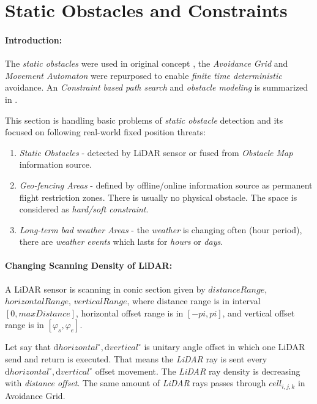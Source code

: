 \cleardoublepage
\section{Static Obstacles and Constraints}\label{s:staticObstacles}
    
\paragraph{Introduction:} The \emph{static obstacles} were used in original concept \cite{gomola2017probabilistic}, the \emph{Avoidance Grid} and \emph{Movement Automaton} were repurposed to enable \emph{finite time deterministic} avoidance. An \emph{Constraint based path search} and \emph{obstacle modeling} is summarized in \cite{hentenryck2009constraint}.

This section is handling basic problems of \emph{static obstacle} detection and its focused on following real-world fixed position threats:
\begin{enumerate}
    \item \emph{Static Obstacles} - detected by LiDAR sensor or fused from \emph{Obstacle Map} information source.
    
    \item \emph{Geo-fencing Areas} - defined by offline/online information source as permanent flight restriction zones. There is usually no physical obstacle. The space is considered as \emph{hard/soft constraint}.
    
    \item \emph{Long-term bad weather Areas} - the \emph{weather} is changing often (hour period), there are \emph{weather events}  which lasts for \emph{hours} or \emph{days}.
\end{enumerate}


\paragraph{Changing Scanning Density of LiDAR:} A LiDAR sensor is scanning in conic section given by $distance Range$, $horizontal Range$, $vertical Range$, where distance range is in interval $[0,maxDistance]$, horizontal offset range is in $[-pi,pi]$, and vertical offset range is in $[\varphi_s, \varphi_e]$.  

Let say that $\text{d} horizontal^\circ, \text{d} vertical^\circ$ is unitary angle offset in which one LiDAR send and return is executed. That means the \emph{LiDAR} ray is sent every $\text{d} horizontal^\circ, \text{d} vertical^\circ$ offset movement. The \emph{LiDAR} ray density is decreasing with \emph{distance offset}. The same amount of \emph{LiDAR} rays passes through $cell_{i,j,k}$ in Avoidance Grid.

